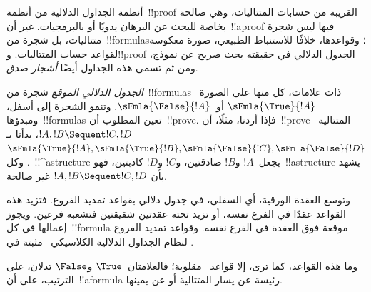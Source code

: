 \documentclass[../../../include/open-logic-section]{subfiles}
\begin{document}


أنظمة الجداول الدلالية من أنظمة~!!{proof} القريبة من حسابات المتتاليات، وهي
صالحة بخاصة للبحث عن البرهان يدويًا أو بالبرمجيات. غير أن~!!a{proof} فيها
ليس شجرة متتاليات، بل شجرة من~!!{formula}s؛ وقواعدها، خلافًا للاستنباط
الطبيعي، صورة معكوسة لقواعد حساب المتتاليات. و!!{proof} الجدول الدلالي في
حقيقته بحث صريح عن نموذج، ومن ثم تسمى هذه الجداول أيضًا \emph{أشجار صدق}.

\emph{الجدول الدلالي الموقع} شجرة من~!!{formula}s ذات علامات، كل منها على
الصورة~$\sFmla{\True}{!A}$ أو~$\sFmla{\False}{!A}$. وتنمو الشجرة إلى
أسفل، ومبدؤها~!!{formula}s تعين المطلوب أن~!!{prove}. فإذا أردنا، مثلًا،
أن~!!{prove} المتتالية~$!A,!B\Sequent !C,!D$، بدأنا بـ
$\sFmla{\True}{!A},\sFmla{\True}{!B},
\sFmla{\False}{!C},\sFmla{\False}{!D}$. وكل~!!^a{structure} يجعل~$!A$
و$!B$ صادقتين، و$!C$ و$!D$ كاذبتين، فهو~!!a{structure} يشهد بأن
$!A,!B\Sequent !C,!D$ غير صالحة.

وتوسع العقدة الورقية، أي السفلى، في جدول دلالي بقواعد تمديد الفروع. فتزيد
هذه القواعد عقدًا في الفرع نفسه، أو تزيد تحته عقدتين شقيقتين فتشعبه فرعين.
ويجوز إعمالها في كل~!!{formula} موقعة فوق العقدة في الفرع نفسه. وقواعد
تمديد الفروع لنظام الجداول الدلالية الكلاسيكي~ مثبتة في
.



وما هذه القواعد، كما ترى، إلا قواعد~ مقلوبة؛ فالعلامتان~$\True$
و$\False$ تدلان، على الترتيب، على أن~!!a{formula} رئيسة عن يسار المتتالية
أو عن يمينها.
\end{document}
